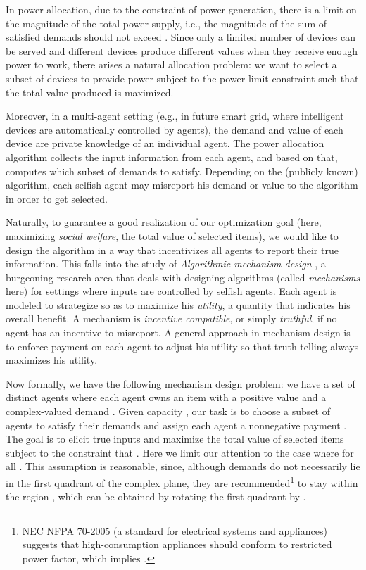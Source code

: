 \documentclass{aamas2013}
\begin{document}
In power allocation, due to the constraint of power generation, there is a limit  on the magnitude of the total power supply, i.e., the magnitude of the sum of satisfied demands should not exceed .  Since only a limited number of devices can be served and different devices produce different values when they receive enough power to work,   
there arises a natural allocation problem: we want to select a subset of devices to provide power subject to the power limit constraint such that the total value produced is maximized.

Moreover, in a multi-agent setting (e.g., in future smart grid, where intelligent devices are automatically controlled by agents), the demand and value of each device are private knowledge of an individual agent.  The power allocation algorithm collects the input information from each agent, and based on that, computes which subset of demands to satisfy.  Depending on the (publicly known) algorithm, each selfish agent may misreport his demand or value to the algorithm in order to get selected.  

Naturally, to guarantee a good realization of our optimization goal (here, maximizing {\em social welfare}, the total value of selected items), we would like to design the algorithm in a way that incentivizes all agents to report their true information.  
This falls into the study of {\em Algorithmic mechanism design} \cite{N07book,NR01alg}, a burgeoning research area that deals with designing algorithms (called {\em mechanisms} here) for settings where inputs are controlled by selfish agents.  
Each agent is modeled to strategize so as to maximize his {\em utility}, a quantity that indicates his overall benefit.
A mechanism is {\em incentive compatible}, or simply {\em truthful}, if no agent has an incentive to misreport.
A general approach in mechanism design is to enforce payment on each agent to adjust his utility so that truth-telling always maximizes his utility.   

Now formally, we have the following mechanism design problem: we have a set  of distinct agents where each agent  owns an item with a positive value  and a complex-valued demand .  Given capacity , our task is to choose a subset  of agents to satisfy their demands and assign each agent  a nonnegative payment .  The goal is to elicit true inputs and maximize the total value of selected items subject to the constraint that .       	
Here we limit our attention to the case where  for all . This assumption is reasonable, since, although demands do not necessarily lie in the first quadrant of the complex plane, they are recommended\footnote{NEC NFPA 70-2005 (a standard for electrical systems and appliances) suggests that high-consumption appliances should conform to restricted power factor, which implies .} to stay within the region , which can be obtained by rotating the first quadrant by .
 
\end{document}
